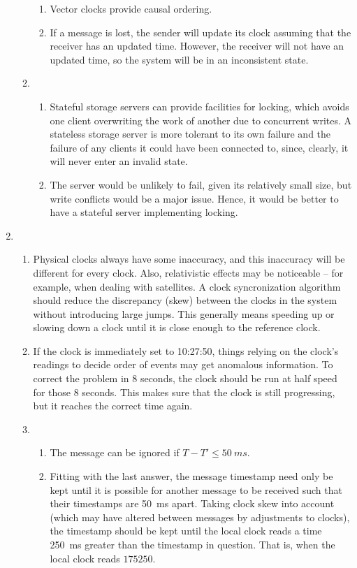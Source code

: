 \documentclass{article}
\begin{document}
\begin{enumerate}
\begin{enumerate}
\begin{enumerate}
          \item Vector clocks provide causal ordering.
          \item If a message is lost, the sender will update its clock assuming that the receiver has an updated time. However, the receiver will not have an updated time, so the system will be in an inconsistent state.
        \end{enumerate}
      \item
        \begin{enumerate}
          \item Stateful storage servers can provide facilities for locking, which avoids one client overwriting the work of another due to concurrent writes. A stateless storage server is more tolerant to its own failure and the failure of any clients it could have been connected to, since, clearly, it will never enter an invalid state.
          \item The server would be unlikely to fail, given its relatively small size, but write conflicts would be a major issue. Hence, it would be better to have a stateful server implementing locking.
        \end{enumerate}
    \end{enumerate}
  \item
    \begin{enumerate}
      \item Physical clocks always have some inaccuracy, and this inaccuracy will be different for every clock. Also, relativistic effects may be noticeable -- for example, when dealing with satellites. A clock syncronization algorithm should reduce the discrepancy (skew) between the clocks in the system without introducing large jumps. This generally means speeding up or slowing down a clock until it is close enough to the reference clock.
      \item If the clock is immediately set to 10:27:50, things relying on the clock's readings to decide order of events may get anomalous information. To correct the problem in 8 seconds, the clock should be run at half speed for those 8 seconds. This makes sure that the clock is still progressing, but it reaches the correct time again.
      \item
        \begin{enumerate}
          \item The message can be ignored if $T - T' \leq \SI{50}{ms}$.
          \item Fitting with the last answer, the message timestamp need only be kept until it is possible for another message to be received such that their timestamps are \SI{50}{ms} apart. Taking clock skew into account (which may have altered between messages by adjustments to clocks), the timestamp should be kept until the local clock reads a time \SI{250}{ms} greater than the timestamp in question. That is, when the local clock reads $175 250$.

\end{enumerate}
\end{enumerate}
\end{enumerate}
\end{document}
